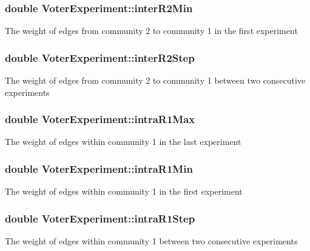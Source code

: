 \subsubsection[{inter\+R2\+Min}]{\setlength{\rightskip}{0pt plus 5cm}double Voter\+Experiment\+::inter\+R2\+Min}\label{class_voter_experiment_a8ddf85950b96c4b19081b77e61e5cb74}
The weight of edges from community 2 to community 1 in the first experiment \hypertarget{class_voter_experiment_af0b724b2c343c5d94bceed53b0f7bfec}{}
\subsubsection[{inter\+R2\+Step}]{\setlength{\rightskip}{0pt plus 5cm}double Voter\+Experiment\+::inter\+R2\+Step}\label{class_voter_experiment_af0b724b2c343c5d94bceed53b0f7bfec}
The weight of edges from community 2 to community 1 between two consecutive experiments \hypertarget{class_voter_experiment_a47c5094262c72f2ef4d41f0592ac91e5}{}
\subsubsection[{intra\+R1\+Max}]{\setlength{\rightskip}{0pt plus 5cm}double Voter\+Experiment\+::intra\+R1\+Max}\label{class_voter_experiment_a47c5094262c72f2ef4d41f0592ac91e5}
The weight of edges within community 1 in the last experiment \hypertarget{class_voter_experiment_affe7cb18bec707f3e07ef494f884b571}{}
\subsubsection[{intra\+R1\+Min}]{\setlength{\rightskip}{0pt plus 5cm}double Voter\+Experiment\+::intra\+R1\+Min}\label{class_voter_experiment_affe7cb18bec707f3e07ef494f884b571}
The weight of edges within community 1 in the first experiment \hypertarget{class_voter_experiment_ad1942e9491c0eb3bc8b27647224ec6fc}{}
\subsubsection[{intra\+R1\+Step}]{\setlength{\rightskip}{0pt plus 5cm}double Voter\+Experiment\+::intra\+R1\+Step}\label{class_voter_experiment_ad1942e9491c0eb3bc8b27647224ec6fc}
The weight of edges within community 1 between two consecutive experiments \hypertarget{class_voter_experiment_a3ed3ee17da83a374fe1f35a995352ac7}{}
